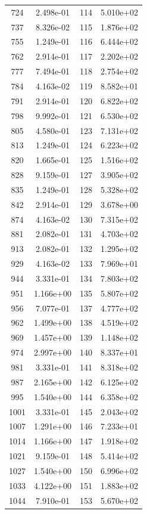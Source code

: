 \documentclass[12pt]{article}
\begin{document}
\begin{longtable}{@{}cccc@{}}
724 & 2.498e-01 & 114 & 5.010e+02 \\
737 & 8.326e-02 & 115 & 1.876e+02 \\
755 & 1.249e-01 & 116 & 6.444e+02 \\
762 & 2.914e-01 & 117 & 2.202e+02 \\
777 & 7.494e-01 & 118 & 2.754e+02 \\
784 & 4.163e-02 & 119 & 8.582e+01 \\
791 & 2.914e-01 & 120 & 6.822e+02 \\
798 & 9.992e-01 & 121 & 6.530e+02 \\
805 & 4.580e-01 & 123 & 7.131e+02 \\
813 & 1.249e-01 & 124 & 6.223e+02 \\
820 & 1.665e-01 & 125 & 1.516e+02 \\
828 & 9.159e-01 & 127 & 3.905e+02 \\
835 & 1.249e-01 & 128 & 5.328e+02 \\
842 & 2.914e-01 & 129 & 3.678e+00 \\
874 & 4.163e-02 & 130 & 7.315e+02 \\
881 & 2.082e-01 & 131 & 4.703e+02 \\
913 & 2.082e-01 & 132 & 1.295e+02 \\
929 & 4.163e-02 & 133 & 7.969e+01 \\
944 & 3.331e-01 & 134 & 7.803e+02 \\
951 & 1.166e+00 & 135 & 5.807e+02 \\
956 & 7.077e-01 & 137 & 4.777e+02 \\
962 & 1.499e+00 & 138 & 4.519e+02 \\
969 & 1.457e+00 & 139 & 1.148e+02 \\
974 & 2.997e+00 & 140 & 8.337e+01 \\
981 & 3.331e-01 & 141 & 8.318e+02 \\
987 & 2.165e+00 & 142 & 6.125e+02 \\
995 & 1.540e+00 & 144 & 6.358e+02 \\
1001 & 3.331e-01 & 145 & 2.043e+02 \\
1007 & 1.291e+00 & 146 & 7.233e+01 \\
1014 & 1.166e+00 & 147 & 1.918e+02 \\
1021 & 9.159e-01 & 148 & 5.414e+02 \\
1027 & 1.540e+00 & 150 & 6.996e+02 \\
1033 & 4.122e+00 & 151 & 1.883e+02 \\
1044 & 7.910e-01 & 153 & 5.670e+02 \\

\end{longtable}
\end{document}
